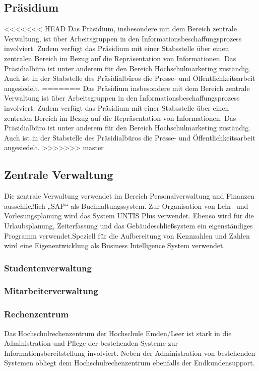 \subsection{Präsidium}
<<<<<<< HEAD
\label{subsection_prasidium}
Das Präsidium, insbesondere mit dem Bereich zentrale Verwaltung, ist über  Arbeitsgruppen in den Informationsbeschaffungsprozess involviert. Zudem verfügt das Präsidium mit einer Stabsstelle über einen zentralen Bereich im Bezug auf die Repräsentation von Informationen.  Das Präsidialbüro ist unter anderem für den Bereich Hochschulmarketing zuständig. Auch ist in der Stabstelle des Präsidialbüros die Presse- und Öffentlichkeitsarbeit angesiedelt.
=======
\label{subsection_zustaendigkeiten_praesidium}
Das Präsidium insbesondere mit dem Bereich zentrale Verwaltung ist über  Arbeitsgruppen in den Informationsbeschaffungsprozess involviert. Zudem verfügt das Präsidium mit einer Stabsstelle über einen zentralen Bereich im Bezug auf die Repräsentation von Informationen.  Das Präsidialbüro ist unter anderem für den Bereich Hochschulmarketing zuständig. Auch ist in der Stabstelle des Präsidialbüros die Presse- und Öffentlichkeitsarbeit angesiedelt.
>>>>>>> master

\subsection{Zentrale Verwaltung}
Die zentrale Verwaltung verwendet im Bereich Personalverwaltung und Finanzen ausschließlich „SAP“ als Buchhaltungssystem. Zur Organisation von Lehr- und Vorlesungsplanung wird das System UNTIS Plus verwendet. Ebenso wird für die Urlaubsplanung, Zeiterfassung und das Gebäudeschließsystem ein eigenständiges Programm verwendet.Speziell für die Aufbereitung von Kennzahlen und Zahlen wird eine Eigenentwicklung als Business Intelligence System verwendet. 

\subsubsection{Studentenverwaltung}
\subsubsection{Mitarbeiterverwaltung}
\subsubsection{Rechenzentrum}
Das Hochschulrechenzentrum der Hochschule Emden/Leer ist stark in die Administration und Pflege der bestehenden Systeme zur Informationsbereitstellung involviert. Neben der Administration von bestehenden Systemen obliegt dem Hochschulrechenzentrum ebenfalls der Endkundensupport.

